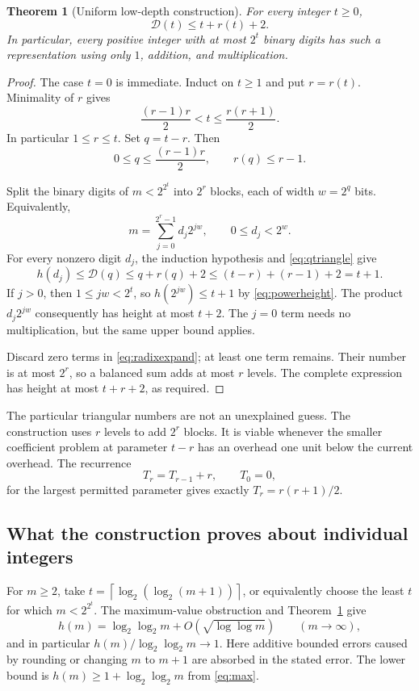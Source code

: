 \documentclass[11pt,a4paper]{article}
\newtheorem{theorem}{Theorem}[section]
\theoremstyle{definition}
\theoremstyle{remark}
\renewcommand{\lg}{\log_2}
\newcommand{\ceil}[1]{\left\lceil #1\right\rceil}
\newcommand{\D}{\mathcal D}
\begin{document}
\begin{theorem}[Uniform low-depth construction]\label{thm:radix}
For every integer $t\ge0$,
\begin{equation}\label{eq:uniform}
 \D(t)\le t+r(t)+2.
\end{equation}
In particular, every positive integer with at most $2^t$ binary digits
has such a representation using only $1$, addition, and multiplication.
\end{theorem}
\begin{proof}
The case $t=0$ is immediate. Induct on $t\ge1$ and put $r=r(t)$.
Minimality of $r$ gives
\[
 \frac{(r-1)r}{2}<t\le\frac{r(r+1)}2.
\]
In particular $1\le r\le t$. Set $q=t-r$. Then
\begin{equation}\label{eq:qtriangle}
 0\le q\le\frac{(r-1)r}{2},\qquad r(q)\le r-1.
\end{equation}

Split the binary digits of $m<2^{2^t}$ into $2^r$ blocks, each of width
$w=2^q$ bits. Equivalently,
\begin{equation}\label{eq:radixexpand}
 m=\sum_{j=0}^{2^r-1}d_j2^{jw},\qquad0\le d_j<2^w.
\end{equation}
For every nonzero digit $d_j$, the induction hypothesis and
\eqref{eq:qtriangle} give
\[
 h(d_j)\le\D(q)\le q+r(q)+2\le(t-r)+(r-1)+2=t+1.
\]
If $j>0$, then $1\le jw<2^t$, so
$h(2^{jw})\le t+1$ by \eqref{eq:powerheight}.
The product $d_j2^{jw}$ consequently has height at most $t+2$.
The $j=0$ term needs no multiplication, but the same upper bound applies.

Discard zero terms in \eqref{eq:radixexpand}; at least one term remains.
Their number is at most $2^r$, so a balanced sum adds at most $r$ levels.
The complete expression has height at most $t+r+2$, as required.
\end{proof}

The particular triangular numbers are not an unexplained guess. The
construction uses $r$ levels to add $2^r$ blocks. It is viable whenever
the smaller coefficient problem at parameter $t-r$ has an overhead one
unit below the current overhead. The recurrence
\[
 T_r=T_{r-1}+r,\qquad T_0=0,
\]
for the largest permitted parameter gives exactly $T_r=r(r+1)/2$.

\subsection{What the construction proves about individual integers}
For $m\ge2$, take $t=\ceil{\lg(\lg(m+1))}$, or equivalently choose the
least $t$ for which $m<2^{2^t}$. The maximum-value obstruction and
Theorem~\ref{thm:radix} give
\begin{equation}\label{eq:height-asymptotic}
 h(m)=\lg\lg m+O(\sqrt{\log\log m})\qquad(m\to\infty),
\end{equation}
and in particular $h(m)/\lg\lg m\to1$.
Here additive bounded errors caused by rounding or changing $m$ to $m+1$
are absorbed in the stated error. The lower bound is
$h(m)\ge1+\lg\lg m$ from \eqref{eq:max}.
\end{document}
